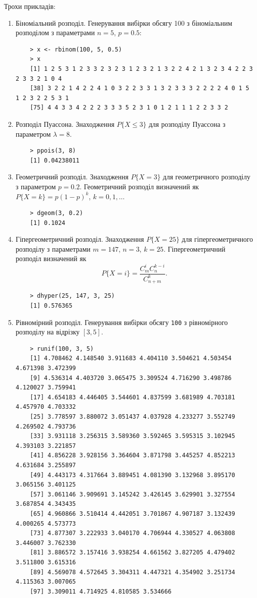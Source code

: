 \documentclass[a4paper, 12pt]{article}
\begin{document}
Трохи прикладів:
\begin{enumerate}
	\item Біноміальний розподіл. Генерування вибірки обсягу 100 з біноміальним розподілом з параметрами $n = 5$, $p = 0.5$:
	\begin{verbatim}
	> x <- rbinom(100, 5, 0.5)
	> x
	[1] 1 2 5 3 1 2 3 3 2 3 2 3 1 2 3 2 1 3 2 2 4 2 1 3 2 3 4 2 2 3 2 3 3 2 1 0 4
	[38] 3 2 2 1 4 2 2 4 1 0 3 2 2 3 3 1 3 2 3 3 3 2 2 2 2 4 0 1 5 1 2 3 2 2 5 3 1
	[75] 4 4 3 3 4 2 2 2 3 3 3 5 2 3 1 0 1 2 1 1 1 2 2 3 3 2
	\end{verbatim}
	
	\item Розподіл Пуассона. Знаходження $P\{ X \le 3 \}$ для розподілу Пуассона з параметром $\lambda = 8$.
	\begin{verbatim}
	> ppois(3, 8)
	[1] 0.04238011
	\end{verbatim}
	
	\item Геометричний розподіл. Знаходження $P \{ X = 3 \}$ для геометричного розподілу з параметром $p = 0.2$. Геометричний розподіл визначений як $P \{ X = k \} = p (1 - p)^k$, $k = 0, 1, \ldots$
	\begin{verbatim}
	> dgeom(3, 0.2)
	[1] 0.1024
	\end{verbatim}
	
	\item Гіпергеометричний розподіл. Знаходження $P \{ X = 25 \}$ для гіпергеометричного розподілу з параметрами $m = 147$, $n = 3$, $k = 25$. Гіпергеометричний розподіл визначений як \[P \{ X = i \} = \frac{C_m^i C_n^{k - i}}{C_{n + m}^k}.\]
	\begin{verbatim}
	> dhyper(25, 147, 3, 25)
	[1] 0.576365
	\end{verbatim}

	\item Рівномірний розподіл. Генерування вибірки обсягу \verb|100| з рівномірного розподілу на відрізку $[3, 5]$.
	\begin{verbatim}
	> runif(100, 3, 5)
	[1] 4.708462 4.148540 3.911683 4.404110 3.504621 4.503454 4.671398 3.472399
	[9] 4.536314 4.403720 3.065475 3.309524 4.716290 3.498786 4.120027 3.759941
	[17] 4.654183 4.446405 3.544601 4.837599 3.681989 4.703181 4.457970 4.703332
	[25] 3.778597 3.880072 3.051437 4.037928 4.233277 3.552749 4.269502 4.793736
	[33] 3.931118 3.256315 3.589360 3.592465 3.595315 3.102945 4.393103 3.221857
	[41] 4.856228 3.928156 3.364604 3.871798 3.445257 4.852213 4.631684 3.255897
	[49] 4.443173 4.317664 3.889451 4.081390 3.132968 3.895170 3.065156 3.401125
	[57] 3.061146 3.909691 3.145242 3.426145 3.629901 3.327554 3.687854 4.343435
	[65] 4.960866 3.510414 4.442051 3.701867 4.907187 3.132439 4.000265 4.573773
	[73] 4.877307 3.222933 3.040170 4.706944 4.330527 4.063808 3.446007 3.762330
	[81] 3.886572 3.157416 3.938254 4.661562 3.827205 4.479402 3.511800 3.615316
	[89] 4.569078 4.572645 3.304311 4.447321 4.354902 3.251734 4.115363 3.007065
	[97] 3.309011 4.714925 4.810585 3.534666
	\end{verbatim}


\end{enumerate}
\end{document}
